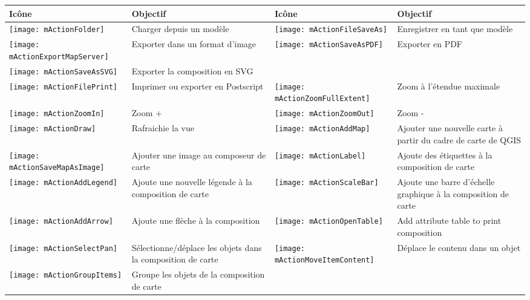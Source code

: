 \begin{table}[p]
\centering\small
\renewcommand{\arraystretch}{2}
 \begin{tabular}{|m{1cm}|m{5.4cm}|m{1cm}|m{5.4cm}|}
 \hline \textbf{Icône} & \textbf{Objectif} & \textbf{Icône} &
 \textbf{Objectif} \\
\hline \texttt{[image: mActionFolder]} & Charger depuis un modèle &
 \texttt{[image: mActionFileSaveAs]} & Enregistrer en tant que modèle \\
\hline \texttt{[image: mActionExportMapServer]}  & Exporter dans un format d'image & 
 \texttt{[image: mActionSaveAsPDF]} & Exporter en PDF \\
\hline \texttt{[image: mActionSaveAsSVG]} & Exporter la composition en SVG& \multicolumn{2}{c|}{}\\
\hline \texttt{[image: mActionFilePrint]} & Imprimer ou exporter en Postscript &
 \texttt{[image: mActionZoomFullExtent]} & Zoom à l'étendue maximale\\
\hline \texttt{[image: mActionZoomIn]} & Zoom + &
 \texttt{[image: mActionZoomOut]} & Zoom - \\
\hline \texttt{[image: mActionDraw]} & Rafraichie la vue &
 \texttt{[image: mActionAddMap]} & Ajouter une nouvelle carte à partir du cadre de carte de QGIS \\
\hline \texttt{[image: mActionSaveMapAsImage]} & Ajouter une image au composeur de carte &
 \texttt{[image: mActionLabel]} & Ajoute des étiquettes à la composition de carte \\
\hline \texttt{[image: mActionAddLegend]} & Ajoute une nouvelle légende à la composition de carte &
 \texttt{[image: mActionScaleBar]} & Ajoute une barre d'échelle graphique à la composition de carte\\
\hline \texttt{[image: mActionAddArrow]} & Ajoute une flèche à la composition & 
 \texttt{[image: mActionOpenTable]} & Add attribute table to print composition \\
\hline \texttt{[image: mActionSelectPan]} & Sélectionne/déplace les objets dans la composition de carte &
 \texttt{[image: mActionMoveItemContent]} & Déplace le contenu dans un objet \\
\hline \texttt{[image: mActionGroupItems]} & Groupe les objets de la composition de carte & 

\end{tabular}
\end{table}
